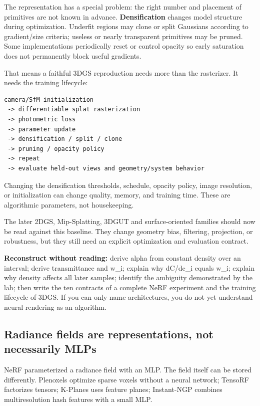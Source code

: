 The representation has a special problem: the right number and placement of primitives are not known in advance. \textbf{Densification} changes model structure during optimization. Underfit regions may clone or split Gaussians according to gradient/size criteria; useless or nearly transparent primitives may be pruned. Some implementations periodically reset or control opacity so early saturation does not permanently block useful gradients.

That means a faithful 3DGS reproduction needs more than the rasterizer. It needs the training lifecycle:

\begin{verbatim}
camera/SfM initialization
 -> differentiable splat rasterization
 -> photometric loss
 -> parameter update
 -> densification / split / clone
 -> pruning / opacity policy
 -> repeat
 -> evaluate held-out views and geometry/system behavior
\end{verbatim}

Changing the densification thresholds, schedule, opacity policy, image resolution, or initialization can change quality, memory, and training time. These are algorithmic parameters, not housekeeping.

The later 2DGS, Mip-Splatting, 3DGUT and surface-oriented families should now be read against this baseline. They change geometry bias, filtering, projection, or robustness, but they still need an explicit optimization and evaluation contract.

\textbf{Reconstruct without reading:} derive alpha from constant density over an interval; derive transmittance and w\_i; explain why dC/dc\_i equals w\_i; explain why density affects all later samples; identify the ambiguity demonstrated by the lab; then write the ten contracts of a complete NeRF experiment and the training lifecycle of 3DGS. If you can only name architectures, you do not yet understand neural rendering as an algorithm.

\subsection{Radiance fields are representations, not necessarily MLPs}\label{radiance-fields-are-representations-not-necessarily-mlps}

NeRF parameterized a radiance field with an MLP. The field itself can be stored differently. Plenoxels optimize sparse voxels without a neural network; TensoRF factorizes tensors; K-Planes uses feature planes; Instant-NGP combines multiresolution hash features with a small MLP.

